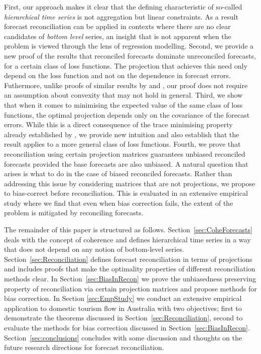 \documentclass[12pt]{article}
\theoremstyle{definition}
\begin{document}
First, our approach makes it clear that the defining characteristic of so-called \emph{hierarchical time series} is not aggregation but linear constraints. As a result forecast reconciliation can be applied in contexts where there are no clear candidates of \emph{bottom level} series, an insight that is not apparent when the problem is viewed through the lens of regression modelling. Second, {\color{blue} we provide a new proof of the results that reconciled forecasts dominate unreconciled forecasts, for a certain class of loss functions. The projection that achieves this need only depend on the loss function and not on the dependence in forecast errors.}  Futhermore, unlike {\color{blue} proofs of similar results by} \citet{VanErven2015a} and \citet{WicEtAl2019}, our proof does not require an assumption about convexity that may not hold in general.  {\color{blue} Third, we show that when it comes to minimising the expected value of the same class of loss functions, the optimal projection depends only on the covariance of the forecast errors.  While this is a direct consequence of the trace minimising property already established by \cite{WicEtAl2019}, we provide new intuition and also establish that the result applies to a more general class of loss functions.  Fourth}, we prove that reconciliation using certain projection matrices guarantees unbiased reconciled forecasts provided the base forecasts are also unbiased. A natural question that arises is what to do in the case of biased reconciled forecasts. Rather than addressing this issue by considering matrices that are not projections, we propose to bias-correct before reconciliation. This is evaluated in an extensive empirical study where we find that even when bias correction fails, the extent of the problem is mitigated by reconciling forecasts.

The remainder of this paper is structured as follows. Section~\ref{sec:CoheForecasts} deals with the concept of coherence and defines hierarchical time series in a way that does not depend on any notion of bottom-level series. Section~\ref{sec:Reconciliation} defines forecast reconciliation in terms of projections and includes proofs that make the optimality properties of different reconciliation methods clear. In Section~\ref{sec:BiasInRecon} we prove the unbiasedness preserving property of reconciliation via certain projection matrices and propose methods for bias correction. In Section \ref{sec:EmpStudy} we conduct an extensive empirical application to domestic tourism flow in Australia with two objectives; first to demonstrate the theorems discussed in Section~\ref{sec:Reconciliation}, second to evaluate the methods for bias correction discussed in Section~\ref{sec:BiasInRecon}. Section~\ref{sec:conclusions} concludes with some discussion and thoughts on the future research directions {\color{blue}for} forecast reconciliation.
\end{document}

